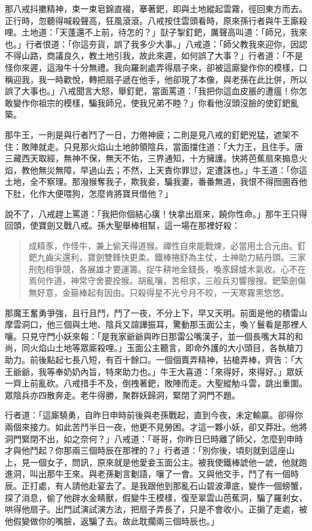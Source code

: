那八戒抖擻精神，束一束皂錦直裰，搴著鈀，即與土地縱起雲霧，徑回東方而去。正行時，忽聽得喊殺聲高，狂風滾滾。八戒按住雲頭看時，原來孫行者與牛王廝殺哩。土地道：「天蓬還不上前，待怎的？」獃子掣釘鈀，厲聲高叫道：「師兄，我來也。」行者恨道：「你這夯貨，誤了我多少大事。」八戒道：「師父教我來迎你，因認不得山路，商議良久，教土地引我，故此來遲，如何誤了大事？」行者道：「不是怪你來遲，這潑牛十分無禮。我向羅剎處弄得扇子來，卻被這廝變作你的模樣，口稱迎我，我一時歡悅，轉把扇子遞在他手，他卻現了本像，與老孫在此比併，所以誤了大事也。」八戒聞言大怒，舉釘鈀，當面罵道：「我把你這血皮脹的遭瘟！你怎敢變作你祖宗的模樣，騙我師兄，使我兄弟不睦？」你看他沒頭沒臉的使釘鈀亂築。

那牛王，一則是與行者鬥了一日，力倦神疲；二則是見八戒的釘鈀兇猛，遮架不住：敗陣就走。只見那火焰山土地帥領陰兵，當面擋住道：「大力王，且住手。唐三藏西天取經，無神不保，無天不佑，三界通知，十方擁護。快將芭蕉扇來搧息火焰，教他無災無障，早過山去；不然，上天責你罪愆，定遭誅也。」牛王道：「你這土地，全不察理。那潑猴奪我子，欺我妾，騙我妻，番番無道，我恨不得囫圇吞他下肚，化作大便喂狗，怎麼肯將寶貝借他？」

說不了，八戒趕上罵道：「我把你個結心癀！快拿出扇來，饒你性命。」那牛王只得回頭，使寶劍又戰八戒。孫大聖舉棒相幫，這一場在那裡好殺：
\begin{quote}
成精豕，作怪牛，兼上偷天得道猴。禪性自來能戰煉，必當用土合元由。釘鈀九齒尖還利，寶劍雙鋒快更柔。鐵棒捲舒為主仗，土神助力結丹頭。三家刑剋相爭競，各展雄才要運籌。捉牛耕地金錢長，喚豕歸爐木氣收。心不在焉何作道，神常守舍要拴猴。胡亂嚷，苦相求，三般兵刃響搜搜。鈀築劍傷無好意，金箍棒起有因由。只殺得星不光兮月不皎，一天寒霧黑悠悠。
\end{quote}

那魔王奮勇爭強，且行且鬥，鬥了一夜，不分上下，早又天明。前面是他的積雷山摩雲洞口，他三個與土地、陰兵又諠譁振耳，驚動那玉面公主，喚丫鬟看是那裡人嚷。只見守門小妖來報：「是我家爺爺與昨日那雷公嘴漢子，並一個長嘴大耳的和尚，同火焰山土地等眾廝殺哩。」玉面公主聽言，即命外護的大小頭目，各執槍刀助力。前後點起七長八短，有百十餘口。一個個賣弄精神，拈槍弄棒，齊告：「大王爺爺，我等奉奶奶內旨，特來助力也。」牛王大喜道：「來得好，來得好。」眾妖一齊上前亂砍。八戒措手不及，倒拽著鈀，敗陣而走。大聖縱觔斗雲，跳出重圍。眾陰兵亦四散奔走。老牛得勝，聚群妖歸洞，緊閉了洞門不題。

行者道：「這廝驍勇，自昨日申時前後與老孫戰起，直到今夜，未定輸贏。卻得你兩個來接力。如此苦鬥半日一夜，他更不見勞困。才這一夥小妖，卻又莽壯。他將洞門緊閉不出，如之奈何？」八戒道：「哥哥，你昨日巳時離了師父，怎麼到申時才與他鬥起？你那兩三個時辰在那裡的？」行者道：「別你後，頃刻就到這座山上，見一個女子，問訊，原來就是他愛妾玉面公主。被我使鐵棒諕他一諕，他就跑進洞，叫出那牛王來。與老孫劖言劖語，嚷了一會。又與他交手，鬥了有一個時辰。正打處，有人請他赴宴去了。是我跟他到那亂石山碧波潭底，變作一個螃蟹，探了消息，偷了他辟水金睛獸，假變牛王模樣，復至翠雲山芭蕉洞，騙了羅剎女，哄得他扇子。出門試演試演方法，把扇子弄長了，只是不會收小。正掮了走處，被他假變做你的嘴臉，返騙了去。故此耽擱兩三個時辰也。」

